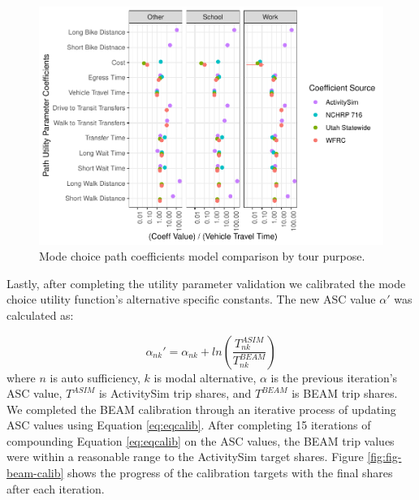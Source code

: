 \documentclass[simple, masters, twoside]{byuthesis}
\begin{document}
\begin{figure}

{\centering \includegraphics{thesis_files/figure-latex/coef-1} 

}

\caption[Path coefficients model comparison.]{Mode choice path coefficients model comparison by tour purpose.}\label{fig:coef}
\end{figure}

Lastly, after completing the utility parameter validation we calibrated the mode choice utility function's alternative specific constants. The new ASC value \(\alpha'\) was calculated as:

\begin{equation}
  \alpha_{nk}' = \alpha_{nk} + ln(\frac{T_{nk}^{ASIM}}{T_{nk}^{BEAM}}) \label{eq:eqcalib}
\end{equation}
where \(n\) is auto sufficiency, \(k\) is modal alternative, \(\alpha\) is the previous iteration's ASC value, \(T^{ASIM}\) is ActivitySim trip shares, and \(T^{BEAM}\) is BEAM trip shares. We completed the BEAM calibration through an iterative process of updating ASC values using Equation \eqref{eq:eqcalib}. After completing 15 iterations of compounding Equation \eqref{eq:eqcalib} on the ASC values, the BEAM trip values were within a reasonable range to the ActivitySim target shares. Figure \ref{fig:fig-beam-calib} shows the progress of the calibration targets with the final shares after each iteration.
\end{document}
